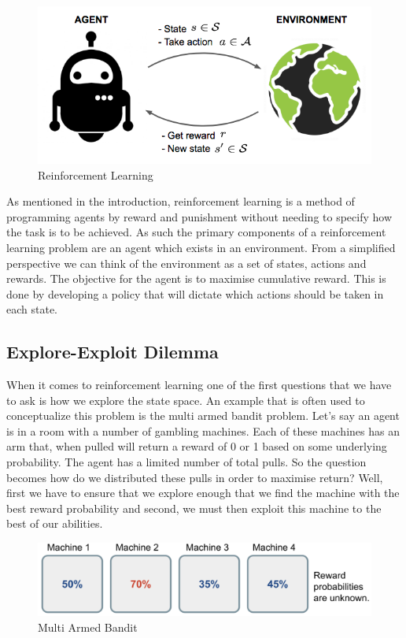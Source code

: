 \begin{figure}[ht]
    \includegraphics[scale=.5]{images/RL_illustration.png}
    \caption{Reinforcement Learning}
\end{figure}

As mentioned in the introduction, reinforcement learning is a method of programming agents by reward and
punishment without needing to specify how the task is to be achieved.
As such the primary components of a reinforcement learning problem are an agent which exists in an environment.
From a simplified perspective we can think of the environment as a set of states, actions and rewards.
The objective for the agent is to maximise cumulative reward.
This is done by developing a policy that will dictate which actions should be taken in each state.

\subsection{Explore-Exploit Dilemma}\label{subsec:exploreExploit}
When it comes to reinforcement learning one of the first questions that we have to ask is how we explore
the state space.
An example that is often used to conceptualize this problem is the multi armed bandit problem.
Let's say an agent is in a room with a number of gambling machines.
Each of these machines has an arm that, when pulled will return a reward of 0 or 1 based on some underlying
probability\citep{kaelbling1996reinforcement}.
The agent has a limited number of total pulls.
So the question becomes how do we distributed these pulls in order to maximise return?
Well, first we have to ensure that we explore enough that we find the machine with the best reward probability
and second, we must then exploit this machine to the best of our abilities.

\begin{figure}[ht]
    \includegraphics[scale=.25]{images/bandit.png}
    \caption{Multi Armed Bandit}
\end{figure}

